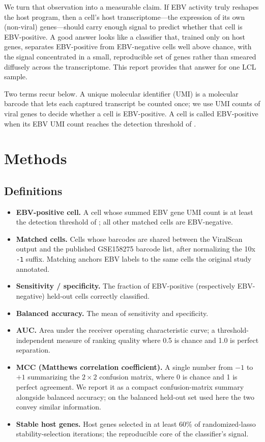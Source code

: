 \documentclass[11pt]{article}
\begin{document}
We turn that observation into a measurable claim. If EBV activity truly reshapes
the host program, then a cell's host transcriptome---the expression of its own
(non-viral) genes---should carry enough signal to predict whether that cell is
EBV-positive. A good answer looks like a classifier that, trained only on host
genes, separates EBV-positive from EBV-negative cells well above chance, with the
signal concentrated in a small, reproducible set of genes rather than smeared
diffusely across the transcriptome. This report provides that answer for one LCL
sample.

Two terms recur below. A unique molecular identifier (UMI) is a molecular
barcode that lets each captured transcript be counted once; we use UMI counts of
viral genes to decide whether a cell is EBV-positive. A cell is called
EBV-positive when its EBV UMI count reaches the detection threshold of
.

\section{Methods}

\subsection{Definitions}
\begin{itemize}
  \item \textbf{EBV-positive cell.} A cell whose summed EBV gene UMI count is at
  least the detection threshold of ; all other
  matched cells are EBV-negative.
  \item \textbf{Matched cells.} Cells whose barcodes are shared between the
  ViralScan output and the published GSE158275 barcode list, after normalizing
  the 10x \texttt{-1} suffix. Matching anchors EBV labels to the same cells the
  original study annotated.
  \item \textbf{Sensitivity / specificity.} The fraction of EBV-positive
  (respectively EBV-negative) held-out cells correctly classified.
  \item \textbf{Balanced accuracy.} The mean of sensitivity and specificity.
  \item \textbf{AUC.} Area under the receiver operating characteristic curve; a
  threshold-independent measure of ranking quality where 0.5 is chance and 1.0 is
  perfect separation.
  \item \textbf{MCC (Matthews correlation coefficient).} A single number from
  $-1$ to $+1$ summarizing the $2\times2$ confusion matrix, where 0 is chance and
  1 is perfect agreement. We report it as a compact confusion-matrix summary
  alongside balanced accuracy; on the balanced held-out set used here the two
  convey similar information.
  \item \textbf{Stable host genes.} Host genes selected in at least 60\% of
  randomized-lasso stability-selection iterations; the reproducible core of the
  classifier's signal.
\end{itemize}
\end{document}
